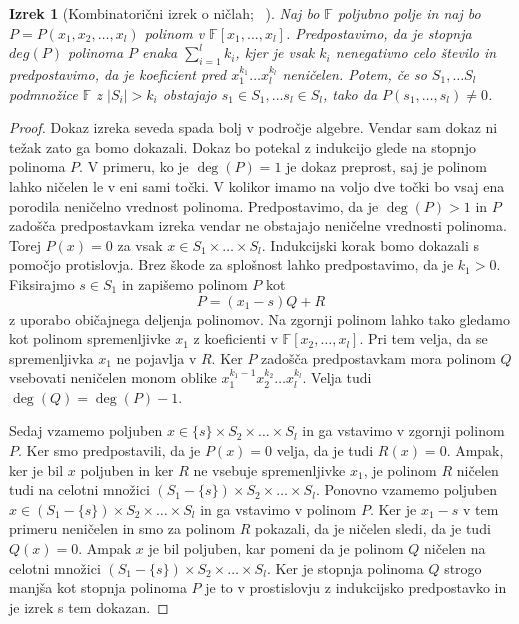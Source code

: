 \documentclass[12pt,a4paper,twoside]{article}
\theoremstyle{definition} %
\theoremstyle{plain} %
\newtheorem{izrek}[definicija]{Izrek}
\numberwithin{equation}{section}  %
\begin{document}
\begin{izrek}[Kombinatorični izrek o ničlah; ~\citet{null}]
\label{zeros}
Naj bo $\mathbb{F}$ poljubno polje in naj bo $P = P(x_1, x_2, \ldots, x_l)$ polinom v $\mathbb{F}[x_1, \ldots, x_l]$. Predpostavimo, da je stopnja $deg(P)$ polinoma $P$ enaka $\sum_{i=1}^l k_i$, kjer je vsak $k_i$ nenegativno celo število in predpostavimo, da je koeficient pred $x_1^{k_1} \ldots x_l^{k_l}$ neničelen. Potem, če so $S_1, \ldots S_l$ podmnožice $\mathbb{F}$ z $|S_i| > k_i $ obstajajo $s_1 \in S_1, \ldots s_l \in S_l$, tako da $P(s_1, \ldots, s_l) \neq 0$.
\end{izrek}

\begin{proof}
Dokaz izreka seveda spada bolj v področje algebre. Vendar sam dokaz ni težak zato ga bomo dokazali. Dokaz bo potekal z indukcijo glede na stopnjo polinoma $P$. V primeru, ko je $\deg(P) = 1$ je dokaz preprost, saj je polinom lahko ničelen le v eni sami točki. V kolikor imamo na voljo dve točki bo vsaj ena porodila neničelno vrednost polinoma. Predpostavimo, da je $\deg(P) > 1$ in $P$ zadošča predpostavkam izreka vendar ne obstajajo neničelne vrednosti polinoma. Torej $P(x) = 0$ za vsak $x \in S_1 \times \ldots \times S_l$. Indukcijski korak bomo dokazali s pomočjo protislovja. Brez škode za splošnost lahko predpostavimo, da je $k_1 > 0$. Fiksirajmo $s \in S_1$ in zapišemo polinom $P$ kot 
$$ P = (x_1 - s)Q + R $$ 
z uporabo običajnega deljenja polinomov. Na zgornji polinom lahko tako gledamo kot polinom spremenljivke $x_1$ z koeficienti v $\mathbb{F}[x_2, \ldots, x_l]$. Pri tem velja, da se spremenljivka $x_1$ ne pojavlja v $R$. Ker $P$ zadošča predpostavkam mora polinom $Q$ vsebovati neničelen monom oblike  $x_1^{k_1 - 1} x_2^{k_2} \ldots x_l^{k_l}$. Velja tudi $\deg(Q) = \deg(P) - 1$.

Sedaj vzamemo poljuben $x \in \{s\} \times S_2 \times \ldots \times S_l$ in ga vstavimo v zgornji polinom $P$. Ker smo predpostavili, da je $P(x)=0$ velja, da je tudi $R(x) = 0$. Ampak, ker je bil $x$ poljuben in ker $R$ ne vsebuje spremenljivke $x_1$, je polinom $R$ ničelen tudi na celotni množici $(S_1 - \{s\}) \times S_2 \times \ldots \times S_l$. Ponovno vzamemo poljuben $x \in (S_1 - \{s\}) \times S_2 \times \ldots \times S_l $ in ga vstavimo v polinom $P$. Ker je $x_1 - s$ v tem primeru neničelen in smo za polinom $R$ pokazali, da je ničelen sledi, da je tudi $Q(x) = 0$. Ampak $x$ je bil poljuben, kar pomeni da je polinom $Q$ ničelen na celotni množici $ (S_1 - \{s\}) \times S_2 \times \ldots \times S_l$. Ker je stopnja polinoma $Q$ strogo manjša kot stopnja polinoma $P$ je to v prostislovju z indukcijsko predpostavko in je izrek s tem dokazan. 
\end{proof}
\end{document}
